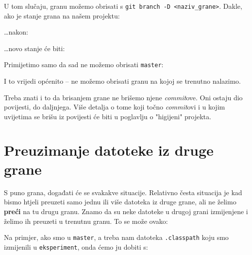 U tom slučaju, granu možemo obrisati s \verb+git branch -D <naziv_grane>+. 
Dakle, ako je stanje grana na našem projektu:



\dots{}nakon:



\dots{}novo stanje će biti:



Primijetimo samo da sad ne možemo obrisati \verb+master+:



I to vrijedi općenito -- ne možemo obrisati granu na kojoj se trenutno nalazimo.

Treba znati i to da brisanjem grane ne brišemo njene \emph{commit}ove.
Oni ostaju dio povijesti, do daljnjega.
Više detalja o tome koji točno \emph{commit}ovi i u kojim uvijetima se brišu iz povijesti će biti u poglavlju o "higijeni" projekta.

\section*{Preuzimanje datoteke iz druge grane}

S puno grana, događati će se svakakve situacije.
Relativno česta situacija je kad bismo htjeli preuzeti samo jednu ili više datoteka iz druge grane, ali ne želimo \textbf{preći} na tu drugu granu.
Znamo da su neke datoteke u drugoj grani izmijenjene i želimo ih preuzeti u trenutnu granu.
To se može ovako:


Na primjer, ako smo u \verb+master+, a treba nam datoteka \verb+.classpath+ koju smo izmijenili u \verb+eksperiment+, onda ćemo ju dobiti s:


